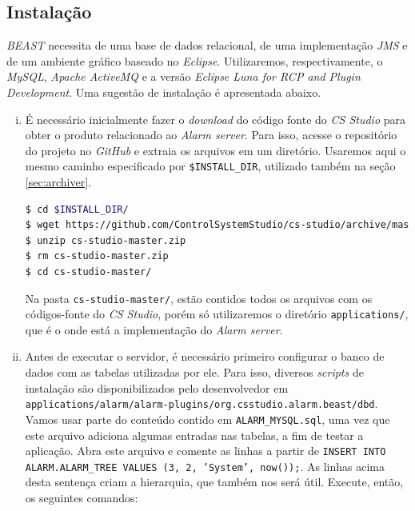 \subsection{Instalação}

\textit{BEAST} necessita de uma base de dados relacional, de uma implementação
\textit{JMS} e de um ambiente gráfico baseado no \textit{Eclipse}. Utilizaremos,
respectivamente, o \textit{MySQL}, \textit{Apache ActiveMQ} e a versão
\textit{Eclipse Luna for RCP and Plugin Development}. Uma sugestão de instalação
é apresentada abaixo.

\begin{enumerate}[i.]
  \item  É necessário inicialmente fazer o \textit{download} do
  código fonte do \textit{CS Studio} para obter o produto relacionado ao \textit{Alarm server}.
  Para isso, acesse o repositório do projeto no \textit{GitHub} e extraia os
  arquivos em um diretório. Usaremos aqui o mesmo caminho especificado por
  \texttt{\$INSTALL\_DIR}, utilizado também na seção \ref{sec:archiver}.
  
  \begin{lstlisting}[language=bash, style=nonumbers]
$ cd $INSTALL_DIR/
$ wget https://github.com/ControlSystemStudio/cs-studio/archive/master.zip
$ unzip cs-studio-master.zip
$ rm cs-studio-master.zip
$ cd cs-studio-master/
\end{lstlisting}
   
   Na pasta \texttt{cs-studio-master/}, estão contidos todos os arquivos com os
   códigos-fonte do \textit{CS Studio}, porém só utilizaremos o diretório \texttt{applications/},
   que é o onde está a implementação do \textit{Alarm server}.
   
   \item \label{mysql-alarm} Antes de executar o servidor, é necessário primeiro
   configurar o banco de dados com as tabelas utilizadas por ele. Para isso, diversos
   \textit{scripts} de instalação são disponibilizados pelo desenvolvedor em 
   \texttt{applications/alarm/alarm-plugins/org.csstudio.alarm.beast/dbd}. Vamos
   usar parte do conteúdo contido em \texttt{ALARM\_MYSQL.sql}, uma vez que
   este arquivo adiciona algumas entradas nas tabelas, a fim de testar a
   aplicação. Abra este arquivo e comente as linhas a partir de \texttt{INSERT
   INTO ALARM.ALARM\_TREE VALUES (3, 2, 'System', now());}. As linhas acima
   desta sentença criam a hierarquia, que também nos será útil. Execute, então,
   os seguintes comandos:
   

\end{enumerate}
